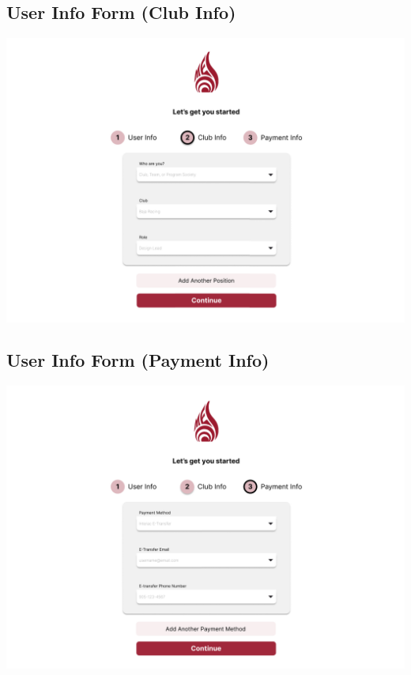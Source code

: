 \documentclass[12pt, titlepage]{article}
\begin{document}
\subsection{User Info Form (Club Info)}
\includegraphics[]{imgs/UserInfoForm-ClubInfo.png}

\subsection{User Info Form (Payment Info)}
\includegraphics[]{imgs/UserInfoForm-Payment.png}
\end{document}

